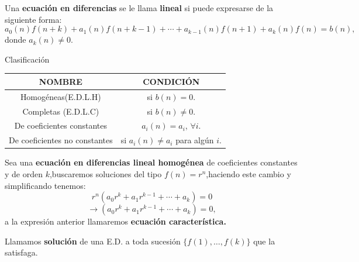 \begin{frame}
	\begin{definition}
		Una \textbf{ecuación en diferencias} se le llama \textbf{lineal}	  si puede expresarse de la siguiente forma:
		\begin{equation}\label{edl} a_{0}(n)f\left(n+k\right)+a_{1}(n)f\left(n+k-1\right)+\cdots+a_{k-1}(n)f\left(n+1\right)+a_{k}(n)f\left(n\right)=b\left(n\right), 
		\end{equation}
		donde $a_{k}(n)\neq0$.
	\end{definition}
  \begin{block}{Clasificación}
	\begin{table}[H]
		\centering
	\begin{tabular}{|c|c|}
				\hline
		   \alert{NOMBRE} & \alert{CONDICIÓN}\\
		   \hline
			Homogéneas(E.D.L.H) &si $b(n)=0$.\\
			\hline
			Completas (E.D.L.C) &si $b(n)\neq0$.\\
			\hline
			De coeficientes constantes & $a_{i}(n)=a_{i}$, $\forall i$.\\
			\hline
			De coeficientes no constantes &si $a_{i}(n)\neq a_{i}$ para algún $i$.\\
			\hline
		\end{tabular}
		\end{table}
	\end{block}
\end{frame}
\begin{frame}
\begin{definition}
	Sea una \textbf{ecuación en diferencias lineal homogénea} de coeficientes constantes y de orden $ k $,buscaremos soluciones del tipo  $f(n)=r^{n}$,haciendo este cambio y simplificando  tenemos:
	$$
	r^{n}(a_{0}r^{k}+a_{1}r^{k-1}+\cdots+a_{k})=0
	$$
	$$
	\rightarrow (a_{0}r^{k}+a_{1}r^{k-1}+\cdots+a_{k})=0,
	$$
	a la expresión anterior llamaremos \textbf{ecuación característica.}
\end{definition}
\begin{definition}
	Llamamos \textbf{solución} de una E.D. a toda sucesión $\{ f(1), \ldots, f(k) \}$ que la satisfaga.
\end{definition}

\end{frame}

